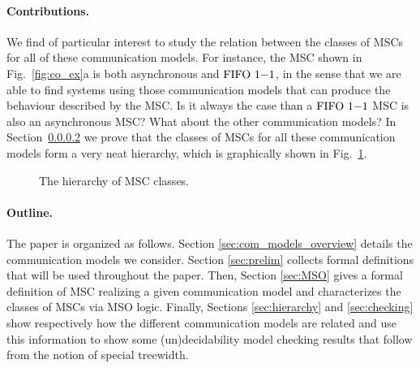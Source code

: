 \paragraph{Contributions.}

We find of particular interest to study the relation between the classes of MSCs for all of these communication models. For instance, the MSC shown in Fig.~\ref{fig:co_ex}a is both asynchronous and $\text{FIFO } 1\mathsf{-}1$, in the sense that we are able to find systems using those communication models that can produce the behaviour described by the MSC. Is it always the case than a $\text{FIFO } 1\mathsf{-}1$ MSC is also an asynchronous MSC? What about the other communication models? In Section~\ref{} we prove that the classes of MSCs for all these communication models form a very neat hierarchy, which is graphically shown in Fig.~\ref{fig:msc_hierarchy_full}.


\begin{figure}[h]
	\centering
	\caption{The hierarchy of MSC classes.}
	\label{fig:msc_hierarchy_full}
\end{figure}



\paragraph{Outline.} The paper is organized as follows. Section \ref{sec:com_models_overview} details the communication models we consider. Section \ref{sec:prelim} collects formal definitions that will be used throughout the paper. Then, Section \ref{sec:MSO} gives a formal definition of MSC realizing a given communication model and characterizes the classes of MSCs via MSO logic. Finally, Sections \ref{sec:hierarchy} and \ref{sec:checking} show respectively how the different communication models are related and use this information to show some (un)decidability model checking results that follow from the notion of special treewidth.

